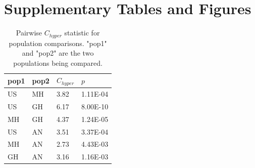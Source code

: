 \documentclass[9pt,twocolumn,twoside,lineno]{biorxiv}
\begin{document}
\section*{Supplementary Tables and Figures}


\begin{table}[h!]

\centering
\begin{tabular}{@{}llll@{}}
\toprule
pop1 & pop2 & $C_{hyper}$   & $p$  \\ \midrule
US   & MH   & 3.82 & 1.11E-04 \\
US   & GH   & 6.17 & 8.00E-10 \\
MH   & GH   & 4.37 & 1.24E-05 \\
US   & AN   & 3.51 & 3.37E-04 \\
MH   & AN   & 2.73 & 4.43E-03 \\
GH   & AN   & 3.16 & 1.16E-03 \\ \bottomrule
\end{tabular}
\label{tab:C_hyper}
\caption{Pairwise $C_{hyper}$ statistic for population comparisons. "pop1" and "pop2" are the two populations being compared.}
\end{table}

\clearpage
\end{document}

